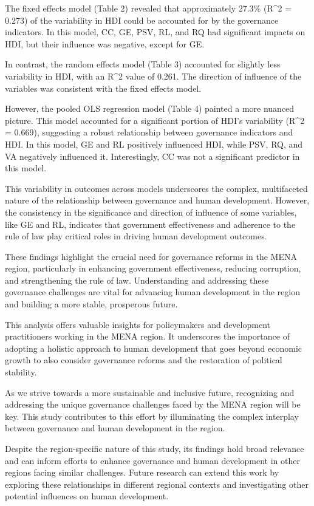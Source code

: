 \documentclass[
  12pt,
]{article}
\begin{document}
The fixed effects model (Table 2) revealed that approximately 27.3\% (R\^{}2 = 0.273) of the variability in HDI could be accounted for by the governance indicators. In this model, CC, GE, PSV, RL, and RQ had significant impacts on HDI, but their influence was negative, except for GE.

In contrast, the random effects model (Table 3) accounted for slightly less variability in HDI, with an R\^{}2 value of 0.261. The direction of influence of the variables was consistent with the fixed effects model.

However, the pooled OLS regression model (Table 4) painted a more nuanced picture. This model accounted for a significant portion of HDI's variability (R\^{}2 = 0.669), suggesting a robust relationship between governance indicators and HDI. In this model, GE and RL positively influenced HDI, while PSV, RQ, and VA negatively influenced it. Interestingly, CC was not a significant predictor in this model.

This variability in outcomes across models underscores the complex, multifaceted nature of the relationship between governance and human development. However, the consistency in the significance and direction of influence of some variables, like GE and RL, indicates that government effectiveness and adherence to the rule of law play critical roles in driving human development outcomes.

These findings highlight the crucial need for governance reforms in the MENA region, particularly in enhancing government effectiveness, reducing corruption, and strengthening the rule of law. Understanding and addressing these governance challenges are vital for advancing human development in the region and building a more stable, prosperous future.

This analysis offers valuable insights for policymakers and development practitioners working in the MENA region. It underscores the importance of adopting a holistic approach to human development that goes beyond economic growth to also consider governance reforms and the restoration of political stability.

As we strive towards a more sustainable and inclusive future, recognizing and addressing the unique governance challenges faced by the MENA region will be key. This study contributes to this effort by illuminating the complex interplay between governance and human development in the region.

Despite the region-specific nature of this study, its findings hold broad relevance and can inform efforts to enhance governance and human development in other regions facing similar challenges. Future research can extend this work by exploring these relationships in different regional contexts and investigating other potential influences on human development.
\end{document}
